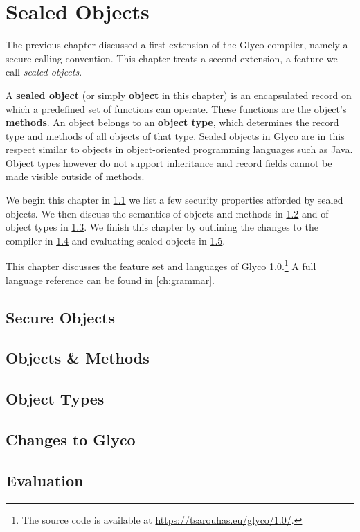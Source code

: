 \documentclass[main.tex]{subfiles}
\begin{document}
\onlyinsubfile{\mainmatter{}}

\chapter{Sealed Objects}
The previous chapter discussed a first extension of the Glyco compiler, namely a secure calling convention. This chapter treats a second extension, a feature we call \emph{sealed objects}.

A \textbf{sealed object} (or simply \textbf{object} in this chapter) is an encapsulated record on which a predefined set of functions can operate. These functions are the object's \textbf{methods}. An object belongs to an \textbf{object type}, which determines the record type and methods of all objects of that type. Sealed objects in Glyco are in this respect similar to objects in object-oriented programming languages such as Java. Object types however do not support inheritance and record fields cannot be made visible outside of methods.

We begin this chapter in \cref{sct:secobj} we list a few security properties afforded by sealed objects. We then discuss the semantics of objects and methods in \cref{sct:objmeth} and of object types in \cref{sct:objty}. We finish this chapter by outlining the changes to the compiler in \cref{sct:obj-changes} and evaluating sealed objects in \cref{sct:obj-eval}.

This chapter discusses the feature set and languages of Glyco 1.0.\footnote{The source code is available at \url{https://tsarouhas.eu/glyco/1.0/}.} A full language reference can be found in \cref{ch:grammar}.

\section{Secure Objects} \label{sct:secobj}

\section{Objects \& Methods} \label{sct:objmeth}

\section{Object Types} \label{sct:objty}

\section{Changes to Glyco} \label{sct:obj-changes}

\section{Evaluation} \label{sct:obj-eval}

\onlyinsubfile{\glsaddall\printglossaries}
\end{document}
